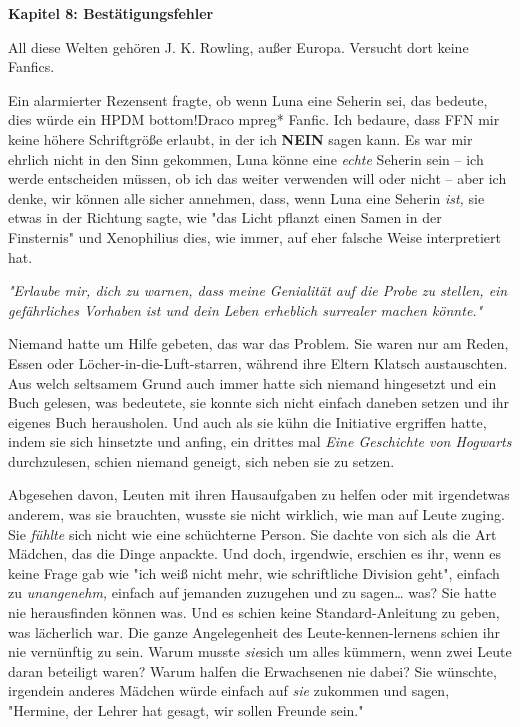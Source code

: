 

\hypertarget{bestuxe4tigungsfehler}{%

\textbf{Kapitel 8: Bestätigungsfehler}

All diese Welten gehören J. K. Rowling, außer Europa. Versucht dort keine Fanfics.

\later

Ein alarmierter Rezensent fragte, ob wenn Luna eine Seherin sei, das bedeute, dies würde ein HPDM bottom!Draco mpreg* Fanfic. Ich bedaure, dass FFN mir keine höhere Schriftgröße erlaubt, in der ich \textbf{NEIN} sagen kann. Es war mir ehrlich nicht in den Sinn gekommen, Luna könne eine \emph{echte} Seherin sein -- ich werde entscheiden müssen, ob ich das weiter verwenden will oder nicht -- aber ich denke, wir können alle sicher annehmen, dass, wenn Luna eine Seherin \emph{ist,} sie etwas in der Richtung sagte, wie "das Licht pflanzt einen Samen in der Finsternis" und Xenophilius dies, wie immer, auf eher falsche Weise interpretiert hat.

\later

\emph{"Erlaube mir, dich zu warnen, dass meine Genialität auf die Probe zu stellen, ein gefährliches Vorhaben ist und dein Leben erheblich surrealer machen könnte."}

\later

Niemand hatte um Hilfe gebeten, das war das Problem. Sie waren nur am Reden, Essen oder Löcher-in-die-Luft-starren, während ihre Eltern Klatsch austauschten. Aus welch seltsamem Grund auch immer hatte sich niemand hingesetzt und ein Buch gelesen, was bedeutete, sie konnte sich nicht einfach daneben setzen und ihr eigenes Buch herausholen. Und auch als sie kühn die Initiative ergriffen hatte, indem sie sich hinsetzte und anfing, ein drittes mal \emph{Eine Geschichte von Hogwarts} durchzulesen, schien niemand geneigt, sich neben sie zu setzen.

Abgesehen davon, Leuten mit ihren Hausaufgaben zu helfen oder mit irgendetwas anderem, was sie brauchten, wusste sie nicht wirklich, wie man auf Leute zuging. Sie \emph{fühlte} sich nicht wie eine schüchterne Person. Sie dachte von sich als die Art Mädchen, das die Dinge anpackte. Und doch, irgendwie, erschien es ihr, wenn es keine Frage gab wie "ich weiß nicht mehr, wie schriftliche Division geht", einfach zu \emph{unangenehm,} einfach auf jemanden zuzugehen und zu sagen… was? Sie hatte nie herausfinden können was. Und es schien keine Standard-Anleitung zu geben, was lächerlich war. Die ganze Angelegenheit des Leute-kennen-lernens schien ihr nie vernünftig zu sein. Warum musste \emph{sie}sich um alles kümmern, wenn zwei Leute daran beteiligt waren? Warum halfen die Erwachsenen nie dabei? Sie wünschte, irgendein anderes Mädchen würde einfach auf \emph{sie} zukommen und sagen, "Hermine, der Lehrer hat gesagt, wir sollen Freunde sein."

}
